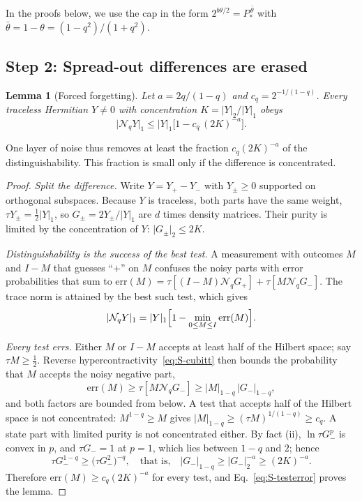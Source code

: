 \documentclass[aps,prl,twocolumn,superscriptaddress,floatfix]{revtex4-2}
\theoremstyle{plain}
\newtheorem{lemma}{Lemma}
\newcommand{\nrm}[2]{\lvert #1\rvert_{#2}}
\newcommand{\Nq}{\mathcal N_q}
\begin{document}
In the proofs below, we use the cap in the form $2^{b\theta/2}=P_*^{\,\bar\theta}$ with $\bar\theta=1-\theta=(1-q^2)/(1+q^2)$.

\subsection{Step 2: Spread-out differences are erased}
\label{sm:forget}

\begin{lemma}[Forced forgetting]\label{lem:forget}
Let $a=2q/(1-q)$ and $c_q=2^{-1/(1-q)}$. Every traceless Hermitian $Y\ne0$ with concentration $K=\nrm Y2/\nrm Y1$ obeys
\begin{equation}
\nrm{\Nq Y}1\le\nrm Y1\bigl[1-c_q\,(2K)^{-a}\bigr].
\label{eq:S-forget}
\end{equation}
\end{lemma}

One layer of noise thus removes at least the fraction $c_q(2K)^{-a}$ of the distinguishability. This fraction is small only if the difference is concentrated.

\begin{proof}
\emph{Split the difference.} Write $Y=Y_+-Y_-$ with $Y_\pm\ge0$ supported on orthogonal subspaces. Because $Y$ is traceless, both parts have the same weight, $\tau Y_\pm=\frac12\nrm Y1$, so $G_\pm=2Y_\pm/\nrm Y1$ are $d$ times density matrices. Their purity is limited by the concentration of $Y$: $\nrm{G_\pm}2\le2K$.

\emph{Distinguishability is the success of the best test.} A measurement with outcomes $M$ and $I-M$ that guesses ``$+$'' on $M$ confuses the noisy parts with error probabilities that sum to $\mathrm{err}(M)=\tau[(I-M)\Nq G_+]+\tau[M\Nq G_-]$. The trace norm is attained by the best such test, which gives
\begin{equation}
\nrm{\Nq Y}1=\nrm Y1\Bigl[1-\min_{0\le M\le I}\mathrm{err}(M)\Bigr].
\label{eq:S-testerror}
\end{equation}

\emph{Every test errs.} Either $M$ or $I-M$ accepts at least half of the Hilbert space; say $\tau M\ge\frac12$. Reverse hypercontractivity~\eqref{eq:S-cubitt} then bounds the probability that $M$ accepts the noisy negative part,
\[
\mathrm{err}(M)\ge\tau[M\Nq G_-]\ge\nrm M{1-q}\,\nrm{G_-}{1-q},
\]
and both factors are bounded from below. A test that accepts half of the Hilbert space is not concentrated: $M^{1-q}\ge M$ gives $\nrm M{1-q}\ge(\tau M)^{1/(1-q)}\ge c_q$. A state part with limited purity is not concentrated either. By fact (ii), $\ln\tau G_-^p$ is convex in $p$, and $\tau G_-=1$ at $p=1$, which lies between $1-q$ and $2$; hence
\[
\tau G_-^{1-q}\ge\bigl(\tau G_-^2\bigr)^{-q},\quad\text{that is,}\quad\nrm{G_-}{1-q}\ge\nrm{G_-}2^{-a}\ge(2K)^{-a}.
\]
Therefore $\mathrm{err}(M)\ge c_q(2K)^{-a}$ for every test, and Eq.~\eqref{eq:S-testerror} proves the lemma.
\end{proof}
\end{document}
